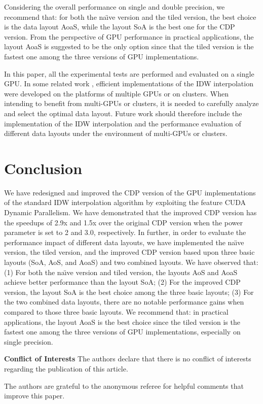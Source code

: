 Considering the overall performance on single and double precision, we 
recommend that: for both the na\"{\i}ve version and the tiled version, the 
best choice is the data layout AoaS, while the layout SoA is the best one 
for the CDP version. From the perspective of GPU performance in practical applications, the layout 
AoaS is suggested to be the only option since that the tiled version is the 
fastest one among the three versions of GPU implementations. 

In this paper, all the experimental tests are performed and evaluated on a 
single GPU. In some related work \cite{guan2010,huang2011}, efficient implementations of 
the IDW interpolation were developed on the platforms of multiple GPUs or on
clusters. When intending to benefit from multi-GPUs or clusters, it is 
needed to carefully analyze and select the optimal data layout. Future work 
should therefore include the implementation of the IDW interpolation and the 
performance evaluation of different data layouts under the environment of 
multi-GPUs or clusters. 



\section{Conclusion}
\label{sec:conclusion}

We have redesigned and improved the CDP version of the GPU implementations 
of the standard IDW interpolation algorithm by exploiting the feature CUDA 
Dynamic Parallelism. We have demonstrated that the improved CDP version has 
the speedups of 2.9x and 1.5x over the original CDP version when the power 
parameter  is set to 2 and 3.0, respectively. In further, in order to 
evaluate the performance impact of different data layouts, we have 
implemented the na\"{\i}ve version, the tiled version, and the improved CDP 
version based upon three basic layouts (SoA, AoS, and AoaS) and two combined 
layouts. We have observed that: (1) For both the na\"{\i}ve version and 
tiled version, the layouts AoS and AoaS achieve better performance than the 
layout SoA; (2) For the improved CDP version, the layout SoA is the best 
choice among the three basic layouts; (3) For the two combined data layouts, 
there are no notable performance gains when compared to those three basic 
layouts. We recommend that: in practical applications, the layout AoaS is 
the best choice since the tiled version is the fastest one among the three 
versions of GPU implementations, especially on single precision. 


\begin{flushleft}
\textbf{Conflict of Interests}
The authors declare that there is no 
conflict of interests regarding the publication of this article.
\end{flushleft}

\begin{acknowledgements}
The authors are grateful to the anonymous referee 
for helpful comments that improve this paper.
\end{acknowledgements}

 
   


